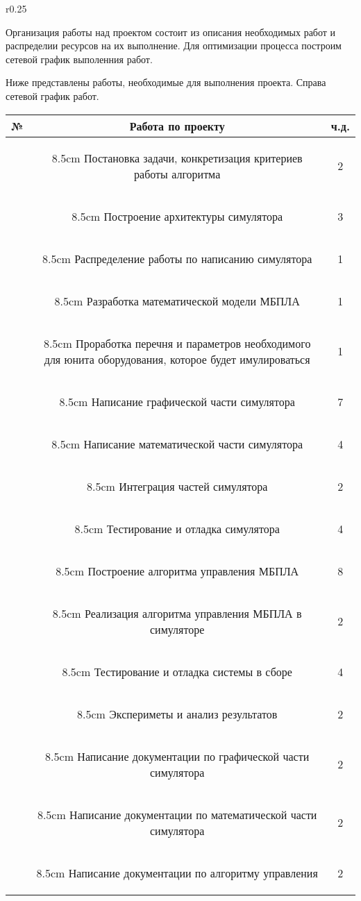 {\begin{wrapfigure}{r}{0.25\linewidth}
\begin{flushright}
\end{flushright}
\end{wrapfigure}

Организация работы над проектом состоит из описания необходимых работ
и распределии ресурсов на их выполнение. Для оптимизации процесса
построим сетевой график выполенния работ.

Ниже представлены работы, необходимые для выполнения проекта.
Справа сетевой график работ.

\vspace{1em}

\def\taskNo{\addtocounter{taskNoCounter}{1}\arabic{taskNoCounter}}

\newcommand{\ttelem}[2]%
{
    \hline
    \taskNo & \begin{tabpage}{8.5cm}
    #1
    \end{tabpage} &#2 \\
}

\begin{flushleft}
\begin{tabular}{|c|c|c|}

\hline
№ & Работа по проекту & ч.д. \\

\ttelem{Постановка задачи, конкретизация критериев работы алгоритма}{2}

\ttelem{Построение архитектуры симулятора}{3}

\ttelem{Распределение работы по написанию симулятора}{1}

\ttelem{Разработка математической модели МБПЛА}{1}

\ttelem{Проработка перечня и параметров необходимого
для юнита оборудования, которое будет имулироваться}{1}

\ttelem{Написание графической части симулятора}{7}

\ttelem{Написание математической части симулятора}{4}

\ttelem{Интеграция частей симулятора}{2}

\ttelem{Тестирование и отладка симулятора}{4}

\ttelem{Построение алгоритма управления \lb МБПЛА}{8}

\ttelem{Реализация алгоритма управления МБПЛА в симуляторе}{2}

\ttelem{Тестирование и отладка системы в сборе}{4}

\ttelem{Экспериметы и анализ результатов}{2}

\ttelem{Написание документации по графической части симулятора}{2}

\ttelem{Написание документации по математической части симулятора}{2}

\ttelem{Написание документации по алгоритму управления}{2}

\hline
\end{tabular}
\end{flushleft}
}

